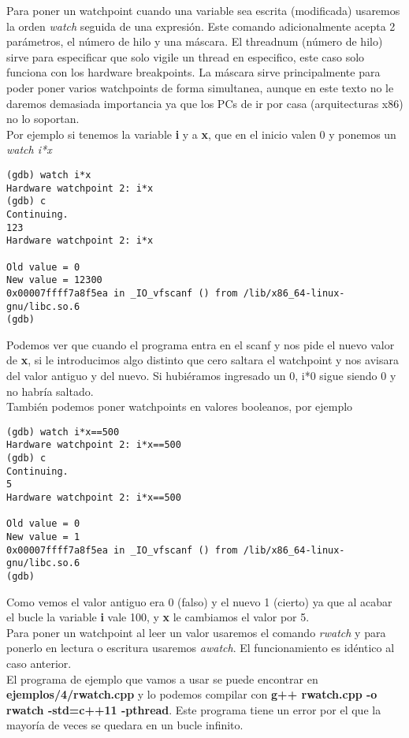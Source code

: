 Para poner un watchpoint cuando una variable sea escrita (modificada) usaremos la orden \emph{watch} seguida de una expresión. Este comando adicionalmente acepta 2 parámetros, el número de hilo y una máscara. El threadnum (número de hilo) sirve para especificar que solo vigile un thread en especifico, este caso solo funciona con los hardware breakpoints. La máscara sirve principalmente para poder poner varios watchpoints de forma simultanea, aunque en este texto no le daremos demasiada importancia ya que los PCs de ir por casa (arquitecturas x86) no lo soportan. \\
Por ejemplo si tenemos la variable \textbf{i} y a \textbf{x}, que en el inicio valen 0 y ponemos un \emph{watch i*x}
\begin{verbatim}
(gdb) watch i*x
Hardware watchpoint 2: i*x
(gdb) c
Continuing.
123
Hardware watchpoint 2: i*x

Old value = 0
New value = 12300
0x00007ffff7a8f5ea in _IO_vfscanf () from /lib/x86_64-linux-gnu/libc.so.6
(gdb) 
\end{verbatim}
Podemos ver que cuando el programa entra en el scanf y nos pide el nuevo valor de \textbf{x}, si le introducimos algo distinto que cero saltara el watchpoint y nos avisara del valor antiguo y del nuevo. Si hubiéramos ingresado un 0, i*0 sigue siendo 0 y no habría saltado. \\
También podemos poner watchpoints en valores booleanos, por ejemplo
\begin{verbatim}
(gdb) watch i*x==500
Hardware watchpoint 2: i*x==500
(gdb) c
Continuing.
5
Hardware watchpoint 2: i*x==500

Old value = 0
New value = 1
0x00007ffff7a8f5ea in _IO_vfscanf () from /lib/x86_64-linux-gnu/libc.so.6
(gdb)
\end{verbatim}
Como vemos el valor antiguo era 0 (falso) y el nuevo 1 (cierto) ya que al acabar el bucle la variable \textbf{i} vale 100, y \textbf{x} le cambiamos el valor por 5.\\

Para poner un watchpoint al leer un valor usaremos el comando \emph{rwatch} y para ponerlo en lectura o escritura usaremos \emph{awatch}. El funcionamiento es idéntico al caso anterior. \\
 
El programa de ejemplo que vamos a usar se puede encontrar en \textbf{ejemplos/4/rwatch.cpp} y lo podemos compilar con \textbf{g++ rwatch.cpp -o rwatch -std=c++11 -pthread}. Este programa tiene un error por el que la mayoría de veces se quedara en un bucle infinito.


